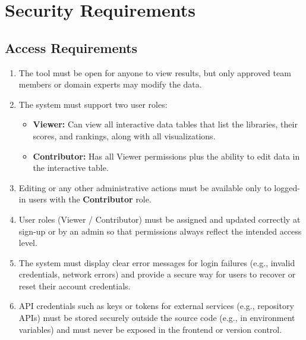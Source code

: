 \documentclass[12pt]{article}
\begin{document}
\section{Security Requirements}
\subsection{Access Requirements}


\begin{enumerate}[label=SR-AC\arabic*]

  \item The tool must be open for anyone to view results, but only approved team members or domain experts may modify the data.

  \item The system must support two user roles:
    \begin{itemize}
        \item \textbf{Viewer:} Can view all interactive data tables that list the libraries, their scores, and rankings, along with all visualizations.
        \item \textbf{Contributor:} Has all Viewer permissions plus the ability to edit data in the interactive table.
    \end{itemize}

  \item Editing or any other administrative actions must be available only to logged-in users with the \textbf{Contributor} role.

  \item User roles (Viewer / Contributor) must be assigned and updated correctly at sign-up or by an admin so that permissions always reflect the intended access level.

  \item The system must display clear error messages for login failures (e.g., invalid credentials, network errors) and provide a secure way for users to recover or reset their account credentials.

  \item API credentials such as keys or tokens for external services (e.g., repository APIs) must be stored securely outside the source code (e.g., in environment variables) and must never be exposed in the frontend or version control.

\end{enumerate}
\end{document}
